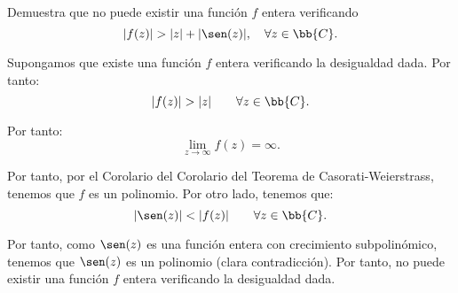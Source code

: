 \documentclass[12pt]{article}
\begin{document}
    \begin{ejercicio}[2.5 puntos]
        Demuestra que no puede existir una función $f$ entera verificando
        \[
            |f(z)| > |z| + |\sen(z)|, \quad \forall z \in \bb{C}.
        \]

        Supongamos que existe una función $f$ entera verificando la desigualdad dada. Por tanto:
        \begin{equation*}
            |f(z)| > |z|\qquad \forall z \in \bb{C}.
        \end{equation*}

        Por tanto:
        \begin{equation*}
            \lim_{z \to \infty} f(z) = \infty.
        \end{equation*}

        Por tanto, por el Corolario del Corolario del Teorema de Casorati-Weierstrass, tenemos que $f$ es un polinomio.
        Por otro lado, tenemos que:
        \begin{equation*}
            |\sen(z)| < |f(z)|\qquad \forall z \in \bb{C}.
        \end{equation*}

        Por tanto, como $\sen(z)$ es una función entera con crecimiento subpolinómico, tenemos que $\sen(z)$ es un polinomio (clara contradicción). Por tanto, no puede existir una función $f$ entera verificando la desigualdad dada.
    \end{ejercicio}
\end{document}
